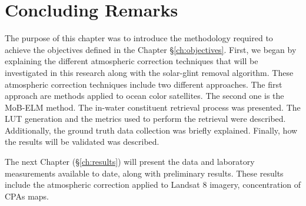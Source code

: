 \section{Concluding Remarks}
The purpose of this chapter was to introduce the methodology required to achieve the objectives defined in the Chapter \S\ref{ch:objectives}. First, we began by explaining the different atmospheric correction techniques that will be investigated in this research along with the solar-glint removal algorithm. These atmospheric correction techniques include two different approaches. The first approach are methods applied to ocean color satellites. The second one is the MoB-ELM method. The in-water constituent retrieval process was presented. The LUT generation and the metrics used to perform the retrieval were described. Additionally, the ground truth data collection was briefly explained. Finally, how the results will be validated was described. 

The next Chapter (\S\ref{ch:results}) will present the data and laboratory measurements available to date, along with preliminary results. These results include the atmospheric correction applied to Landsat 8 imagery, concentration of CPAs maps.


